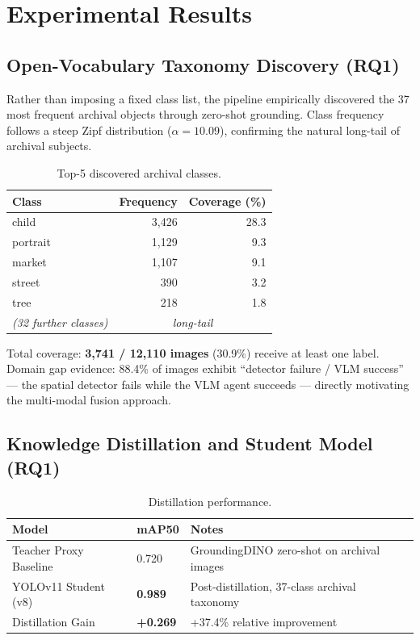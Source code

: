 \documentclass[11pt,a4paper]{article}
\theoremstyle{plain}
\begin{document}
\section{Experimental Results}

\subsection{Open-Vocabulary Taxonomy Discovery (RQ1)}

Rather than imposing a fixed class list, the pipeline empirically discovered the 37 most frequent archival objects through zero-shot grounding. Class frequency follows a steep Zipf distribution ($\alpha = 10.09$), confirming the natural long-tail of archival subjects.

\begin{table}[h]
\centering
\caption{Top-5 discovered archival classes.}
\renewcommand{\arraystretch}{1.25}
\begin{tabular}{lrr}
\toprule
\textbf{Class} & \textbf{Frequency} & \textbf{Coverage (\%)} \\
\midrule
child    & 3{,}426 & 28.3 \\
portrait & 1{,}129 & 9.3  \\
market   & 1{,}107 & 9.1  \\
street   & 390     & 3.2  \\
tree     & 218     & 1.8  \\
\textit{(32 further classes)} & \multicolumn{2}{c}{\textit{long-tail}} \\
\bottomrule
\end{tabular}
\end{table}

Total coverage: \textbf{3{,}741 / 12{,}110 images} (30.9\%) receive at least one label. Domain gap evidence: 88.4\% of images exhibit ``detector failure / VLM success'' — the spatial detector fails while the VLM agent succeeds — directly motivating the multi-modal fusion approach.

\subsection{Knowledge Distillation and Student Model (RQ1)}

\begin{table}[h]
\centering
\caption{Distillation performance.}
\renewcommand{\arraystretch}{1.25}
\begin{tabular}{lll}
\toprule
\textbf{Model} & \textbf{mAP50} & \textbf{Notes} \\
\midrule
Teacher Proxy Baseline   & 0.720 & GroundingDINO zero-shot on archival images \\
YOLOv11 Student (v8)     & \textbf{0.989} & Post-distillation, 37-class archival taxonomy \\
Distillation Gain        & \textbf{+0.269} & +37.4\% relative improvement \\
\bottomrule
\end{tabular}
\end{table}
\end{document}
